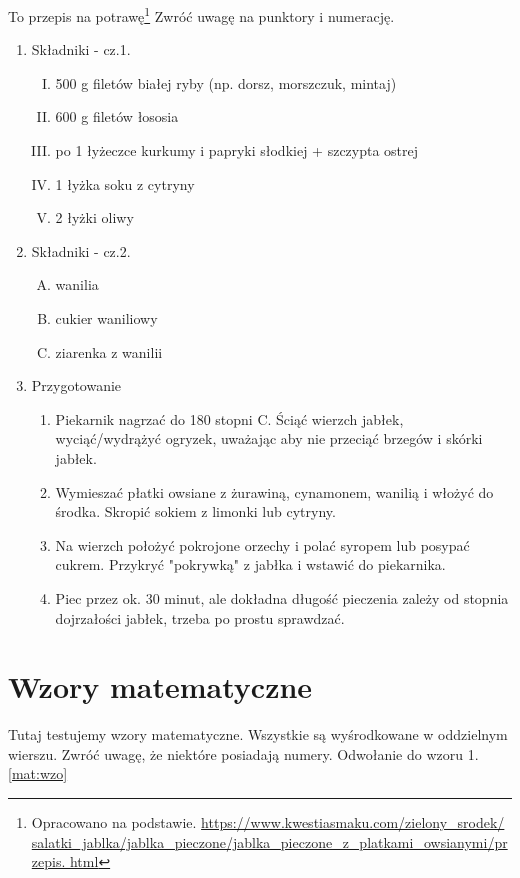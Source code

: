\documentclass[11pt,a4paper]{article}  %
\begin{document}
To przepis na potrawę\footnote{Opracowano na podstawie. \url{https://www.kwestiasmaku.com/zielony_srodek/
salatki_jablka/jablka_pieczone/jablka_pieczone_z_platkami_owsianymi/przepis.
html}} 
Zwróć uwagę na punktory i numerację.

\begin{enumerate}[$\circ$]
\item Składniki - cz.1.
        \begin{enumerate}[I.]
    \item 500 g filetów białej ryby (np. dorsz, morszczuk, mintaj)
    \item 600 g filetów łososia
    \item po 1 łyżeczce kurkumy i papryki słodkiej + szczypta ostrej
    \item 1 łyżka soku z cytryny
    \item 2 łyżki oliwy
        \end{enumerate}
\item Składniki - cz.2.
        \begin{enumerate}[A)]
    \item wanilia 
    \item cukier waniliowy
    \item ziarenka z wanilii
        \end{enumerate}
\item Przygotowanie
        \begin{enumerate}[1.]
\item[1.]Piekarnik nagrzać do 180 stopni C. Ściąć wierzch jabłek, wyciąć/wydrążyć ogryzek, uważając aby nie przeciąć brzegów i skórki jabłek.
\item[2.]Wymieszać płatki owsiane z żurawiną, cynamonem, wanilią i włożyć do środka. Skropić sokiem z limonki lub cytryny.
\item[6.]Na wierzch położyć pokrojone orzechy i polać syropem lub posypać cukrem. Przykryć "pokrywką" z jabłka i wstawić do piekarnika.
\item[7.]Piec przez ok. 30 minut, ale dokładna długość pieczenia zależy od stopnia dojrzałości jabłek, trzeba po prostu sprawdzać.
    \end{enumerate}
\end{enumerate}


\section{Wzory matematyczne}
Tutaj testujemy wzory matematyczne. Wszystkie są wyśrodkowane w oddzielnym wierszu. Zwróć uwagę, że niektóre posiadają numery. Odwołanie
do wzoru 1.\ref{mat:wzo}
\end{document}
